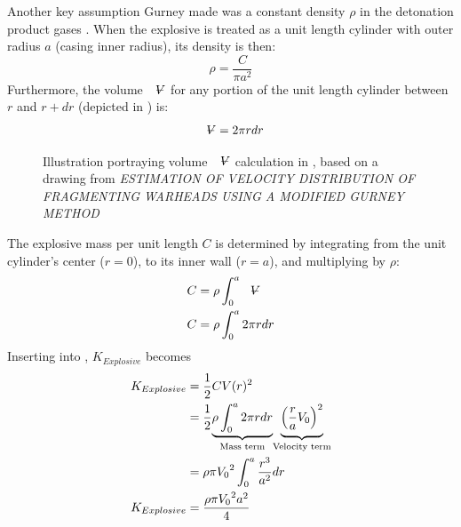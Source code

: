 Another key assumption Gurney made was a constant density $\rho$ in the detonation product gases \cite{GurneyOriginal}. When the explosive is treated as a unit length cylinder with outer radius $a$ (casing inner radius), its density is then:
\begin{equation}
\rho = \frac{C}{\pi{a^2}}
\label{eq:2_explosive_density}
\end{equation}
%
Furthermore, the volume $\volume$ for any portion of the unit length cylinder between $r$ and $r+dr$ (depicted in ) is: 
\begin{equation}
\volume = 2\pi{r}dr
\label{eq:2_unitcylindervolume}
\end{equation}
%
\begin{figure}[H]
	\centering
    \caption{Illustration portraying volume $\volume$ calculation in , based on a drawing from \textit{ESTIMATION OF VELOCITY DISTRIBUTION OF FRAGMENTING WARHEADS USING A MODIFIED GURNEY METHOD} \cite{AFIT_Yves}}
\label{fig:2_Cylinder_dr_calculation}
\end{figure}
%
The explosive mass per unit length $C$ is determined by integrating  from the unit cylinder's center ($r = 0$), to its inner wall ($r = a$), and multiplying by $\rho$:
%
\begin{align}
C &= \rho\int_{0}^{a}\volume \nonumber \\
C &= \rho\int_{0}^{a}2\pi{r}dr
 \label{eq:2_Casingmassintegral}
\end{align}
Inserting  into  , $K_{Explosive}$ becomes
\begin{align}
K_{Explosive} &= \frac{1}{2}CV(r)^2 \nonumber \\
&= \frac{1}{2} {\underbrace{\rho\int_{0}^{a}2\pi{r}dr}_\textrm{Mass term}}
{\underbrace{\vphantom{\int_{0}^{a}}\Big(\frac{r}{a}V_0\Big)^2}_\textrm{Velocity term}} \nonumber \\
 &= \rho\pi{V_0}^2\int_{0}^{a}\frac{r^3}{a^2}dr \nonumber \\
K_{Explosive} &= \frac{\rho\pi{V_0}^2{a^2}}{4}
\label{eq:2_K_explosive_density}
\end{align}
